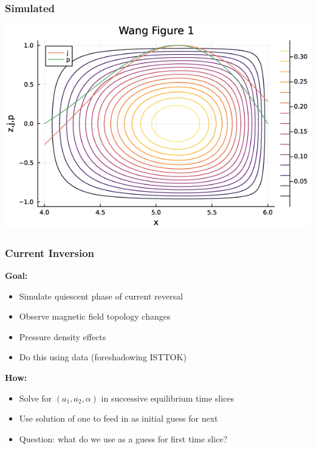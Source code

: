 \documentclass{beamer}
\begin{document}
\begin{frame}
\frametitle{Simulated}

\centering
\includegraphics[scale=0.5]{imgs/wang-fig-1.png}

\end{frame}












\begin{frame}
\frametitle{Current Inversion}

\textbf{Goal:}
\begin{itemize}
    \item Simulate quiescent phase of current reversal
    \item Observe magnetic field topology changes
    \item Pressure density effects
    \item Do this using data (foreshadowing ISTTOK)
\end{itemize}
\textbf{How:}
\begin{itemize}
    \item Solve for $(a_1, a_2, \alpha)$ in successive equilibrium time slices
    \item Use solution of one to feed in as initial guess for next
    \item Question: what do we use as a guess for first time slice?
\end{itemize}
\end{frame}
\end{document}
